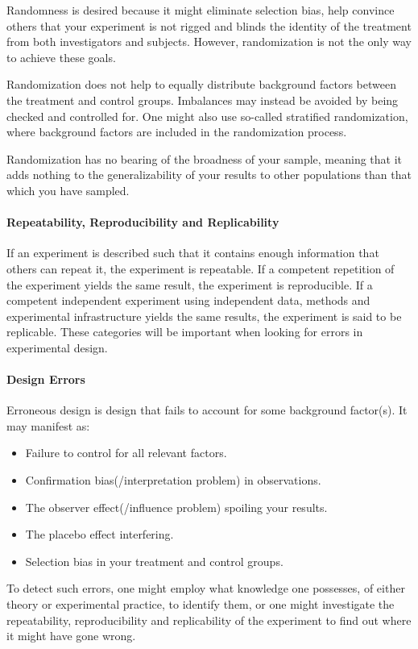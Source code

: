 Randomness is desired because it might eliminate selection bias, help convince others that your experiment is not rigged and blinds the identity of the treatment from both investigators and subjects. However, randomization is not the only way to achieve these goals.

Randomization does not help to equally distribute background factors between the treatment and control groups. Imbalances may instead be avoided by being checked and controlled for. One might also use so-called stratified randomization, where background factors are included in the randomization process.

Randomization has no bearing of the broadness of your sample, meaning that it adds nothing to the generalizability of your results to other populations than that which you have sampled.

\paragraph{Repeatability, Reproducibility and Replicability}
If an experiment is described such that it contains enough information that others can repeat it, the experiment is repeatable. If a competent repetition of the experiment yields the same result, the experiment is reproducible. If a competent independent experiment using independent data, methods and experimental infrastructure yields the same results, the experiment is said to be replicable. These categories will be important when looking for errors in experimental design.

\paragraph{Design Errors}
Erroneous design is design that fails to account for some background factor(s). It may manifest as:
\begin{itemize}
	\item Failure to control for all relevant factors.
	\item Confirmation bias(/interpretation problem) in observations.
	\item The observer effect(/influence problem) spoiling your results.
	\item The placebo effect interfering.
	\item Selection bias in your treatment and control groups.
\end{itemize}

To detect such errors, one might employ what knowledge one possesses, of either theory or experimental practice, to identify them, or one might investigate the repeatability, reproducibility and replicability of the experiment to find out where it might have gone wrong.

